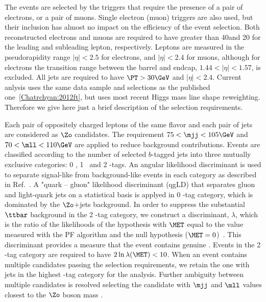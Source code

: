 The events are selected by the triggers that require the presence of a
pair of electrons, or a pair of muons. Single electron (muon) triggers are
also used, but their inclusion has almost no impact on the 
efficiency of the event selection.
Both reconstructed electrons and muons are required to have \PT
greater than 40\GeV and 20\GeV
for the leading and subleading \PT lepton, respectively.
Leptons are measured in the pseudorapidity range $|\eta|<2.5$ for electrons,
and $|\eta|<2.4$ for muons, although for electrons
the transition range between the barrel and endcap, $1.44<|\eta|<1.57$, is excluded.
All jets are required to have $\PT>30\GeV$ and $|\eta| < 2.4$.
Current anlysis uses the same data sample and selections as the published one~\ref{Chatrchyan:2012ft},
but uses most recent Higgs mass line shape reweighting. Therefore we give here 
just a brief description of the selection requirements.

Each pair of oppositely charged leptons of the same flavor and each pair of jets 
are considered as $\Zo$ candidates.
The requirement $75<\mjj<105\GeV$
and $70<\mll<110\GeV$ are applied to reduce background contributions.
Events are classified according to the number of selected $b$-tagged jets
into three mutually exclusive categories:
0 \cPqb, 1 \cPqb\ and 2 \cPqb-tags.  
An angular likelihood discriminant is used to separate signal-like from background-like
events in each category
as described in Ref.~\cite{Gao:2010qx}. 
A "quark -- gluon" likelihood discriminant (qgLD) that separates gluon and light-quark jets 
on a statistical basis is applyed in 
0 \cPqb-tag category, which is dominated by the $\Zo$+jets background.
In order to suppress the substantial $\ttbar$ background in the 2 \cPqb-tag category,
we construct a discriminant, $\lambda$, which is the ratio of the likelihoods of the hypothesis
with $\MET$ equal to the value measured with the PF algorithm and the null
hypothesis ($\MET=0$)~\cite{Chatrchyan:2011tn}.
This discriminant provides a measure that the event contains genuine \MET.
Events in the 2 \cPqb-tag category are required to have
$2\ln{\lambda} (\MET) < 10$. 
When an event contains multiple candidates passing the selection requirements,
we retain the one with jets in the highest \cPqb-tag category for the analysis.
Further ambiguity between multiple candidates is resolved selecting the candidate
with $\mjj$ and $\mll$ values closest to the $\Zo$ boson mass \mZ{}.

